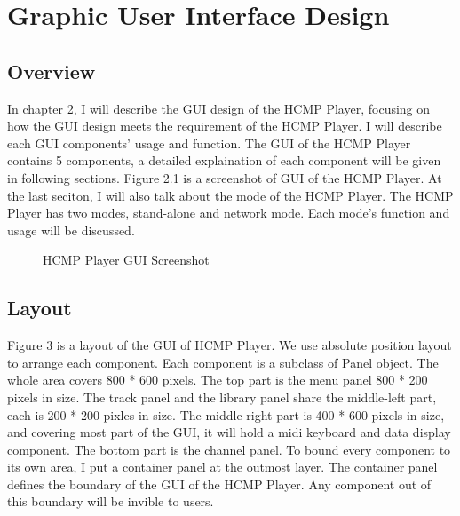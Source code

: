
\chapter{Graphic User Interface Design} %

\section{Overview}
In chapter 2, I will describe the GUI design of the HCMP Player, focusing 
on how the GUI design meets the requirement of the HCMP Player. I will describe
each GUI components' 
usage and function. The GUI of the HCMP Player contains 5 components, 
a detailed explaination of each component will be given in following sections. 
Figure 2.1 is a screenshot of GUI of the HCMP Player. At the last seciton, I will 
also talk about the mode of the HCMP Player. The HCMP Player has two modes, 
stand-alone and network mode. Each mode's function and usage will be discussed.

\begin{figure}[H]
\caption{HCMP Player GUI Screenshot}
\label{fig:speciation}
\end{figure}

\section{Layout}
Figure 3 is a layout of the GUI of HCMP Player. We use absolute position layout 
to arrange each component. Each component is a subclass of Panel object. 
The whole area 
covers 800 * 600 pixels. The top part is the menu panel 800 * 200 pixels 
in size. The track panel and 
the library panel share the middle-left part, each is 200 * 200 pixles in size. 
The middle-right part is 400 * 600 pixels in size, and covering most part of the GUI, 
it will hold a midi keyboard and data display component. The bottom part is the channel   
panel. To bound every component to its own area, I put a container panel at the outmost 
layer. The container panel defines the boundary of the GUI of the HCMP Player. Any 
component out of this boundary will be invible to users.

